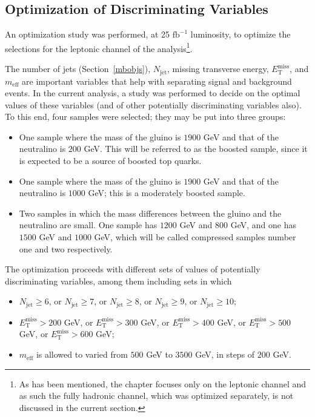 \subsection{Optimization of Discriminating Variables}\label{mb:opt}

An optimization study was performed, at 25 $\text{fb}^{-1}$ luminosity, to
optimize the selections for the leptonic channel of the analysis\footnote{As
	has been mentioned, the chapter focuses only on the leptonic channel and as
	such the fully hadronic channel, which was optimized separately, is not
	discussed in the current section.}.

The number of jets (Section~\ref{mbobjs}), $N_{\text{jet}}$, missing transverse
energy, $E_{\text{T}}^{\text{miss}}$, and $m_{\text{eff}}$ are important
variables that help with separating signal and background events. In the
current analysis, a study was performed to decide on the optimal values of
these variables (and of other potentially discriminating variables also). To
this end, four samples were selected; they may be put into three groups:

\begin{itemize}

	\item One sample where the mass of the gluino is $1900$ GeV and that of the
	      neutralino is $200$ GeV. This will be referred to as the boosted sample, since
	      it is expected to be a source of boosted top quarks.

	\item One sample where the mass of the gluino is $1900$ GeV and that of the
	      neutralino is $1000$ GeV; this is a moderately boosted sample.

	\item Two samples in which the mass differences between the gluino and the
	      neutralino are small. One sample has $1200$ GeV and $800$ GeV, and one has
	      $1500$ GeV and $1000$ GeV, which will be called compressed samples number one
	      and two respectively.

\end{itemize}

The optimization proceeds with different sets of values of potentially
discriminating variables, among them including sets in which

\begin{itemize}

	\item $N_{\text{jet}} \geq 6$, or $N_{\text{jet}} \geq 7$, or $N_{\text{jet}}
		      \geq 8$, or $N_{\text{jet}} \geq 9$, or $N_{\text{jet}} \geq 10$;

	\item $E_{\text{T}}^{\text{miss}} > 200$ GeV, or $E_{\text{T}}^{\text{miss}} >
		      300$ GeV, or $E_{\text{T}}^{\text{miss}} > 400$ GeV, or
	      $E_{\text{T}}^{\text{miss}} > 500$ GeV, or $E_{\text{T}}^{\text{miss}} > 600$
	      GeV;

	\item $m_{\text{eff}}$ is allowed to varied from $500$ GeV to $3500$ GeV, in
	      steps of $200$ GeV.

\end{itemize}

